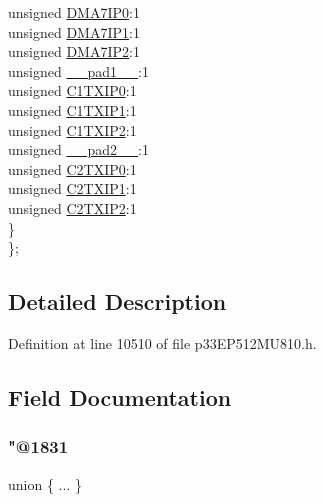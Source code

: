 \begin{DoxyCompactItemize}
\begin{tabbing}
\>\>unsigned \hyperlink{structtag_i_p_c17_b_i_t_s_a6eca1bfba702c6c99cca1f00161a1149}{DMA7IP0}:1\\
\>\>unsigned \hyperlink{structtag_i_p_c17_b_i_t_s_aed89457da0df581d16994e09f82254ad}{DMA7IP1}:1\\
\>\>unsigned \hyperlink{structtag_i_p_c17_b_i_t_s_ab55ff1a4be94206e54fc86eac5cc95b2}{DMA7IP2}:1\\
\>\>unsigned \hyperlink{structtag_i_p_c17_b_i_t_s_acaf2d0924a107ec6e8d2e31febaf66f9}{\_\_pad1\_\_}:1\\
\>\>unsigned \hyperlink{structtag_i_p_c17_b_i_t_s_a879a30dfe9a01f36dad608dbc9c30c2e}{C1TXIP0}:1\\
\>\>unsigned \hyperlink{structtag_i_p_c17_b_i_t_s_a9e559a8c77e6e06d609e0596290e1a97}{C1TXIP1}:1\\
\>\>unsigned \hyperlink{structtag_i_p_c17_b_i_t_s_a93e399eb1f22a9e92c587fb16f42ae63}{C1TXIP2}:1\\
\>\>unsigned \hyperlink{structtag_i_p_c17_b_i_t_s_a4d97cc5f7d51d22fc2bf3eab35c9cb7f}{\_\_pad2\_\_}:1\\
\>\>unsigned \hyperlink{structtag_i_p_c17_b_i_t_s_a3ba6159b82d5b8b5e6da278f2c48c54d}{C2TXIP0}:1\\
\>\>unsigned \hyperlink{structtag_i_p_c17_b_i_t_s_ada1095e4fc5eee4f9ac654ae7e2d7746}{C2TXIP1}:1\\
\>\>unsigned \hyperlink{structtag_i_p_c17_b_i_t_s_a4e27e8714a9729ad7dec9cfc46cec851}{C2TXIP2}:1\\
\>\} \\
\}; \\

\end{tabbing}\end{DoxyCompactItemize}


\subsection{Detailed Description}


Definition at line 10510 of file p33\+E\+P512\+M\+U810.\+h.



\subsection{Field Documentation}
\mbox{\label{structtag_i_p_c17_b_i_t_s_a91860b402f2b8cd7a1397e52dcd73832}} 
\subsubsection{\texorpdfstring{"@1831}{@1831}}
{\footnotesize\ttfamily union \{ ... \} }

